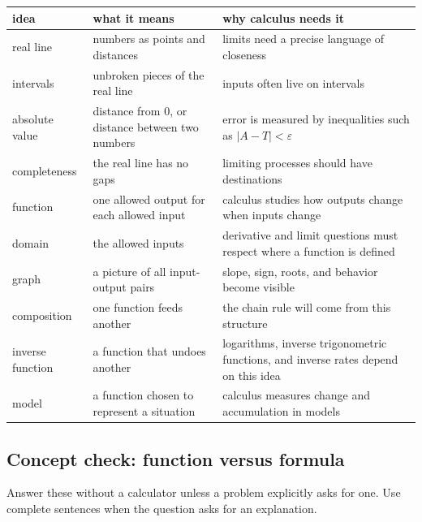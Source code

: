 \begin{center}
\renewcommand{\arraystretch}{1.35}
\begin{tabular}{p{}|p{}|p{}}
\textbf{idea} & \textbf{what it means} & \textbf{why calculus needs it} \\ \hline
real line & numbers as points and distances & limits need a precise language of closeness \\ \hline
intervals & unbroken pieces of the real line & inputs often live on intervals \\ \hline
absolute value & distance from \(0\), or distance between two numbers & error is measured by inequalities such as \(|A-T|<\varepsilon\) \\ \hline
completeness & the real line has no gaps & limiting processes should have destinations \\ \hline
function & one allowed output for each allowed input & calculus studies how outputs change when inputs change \\ \hline
domain & the allowed inputs & derivative and limit questions must respect where a function is defined \\ \hline
graph & a picture of all input-output pairs & slope, sign, roots, and behavior become visible \\ \hline
composition & one function feeds another & the chain rule will come from this structure \\ \hline
inverse function & a function that undoes another & logarithms, inverse trigonometric functions, and inverse rates depend on this idea \\ \hline
model & a function chosen to represent a situation & calculus measures change and accumulation in models
\end{tabular}
\end{center}

\subsection{Concept check: function versus formula}
\label{subsec:concept-check-function-formula}

Answer these without a calculator unless a problem explicitly asks for one. Use complete sentences when the question asks for an explanation.

